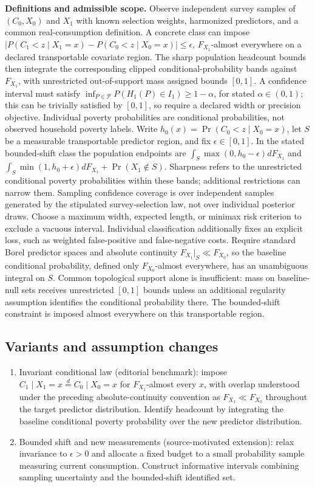 \documentclass[11pt,a4paper]{article}
\begin{document}
\textbf{Definitions and admissible scope.} Observe independent survey samples of \((C_0,X_0)\) and \(X_1\) with known selection weights, harmonized predictors, and a common real-consumption definition. A concrete class can impose \(|P(C_1<z\mid X_1=x)-P(C_0<z\mid X_0=x)|\le\epsilon\), \(F_{X_1}\)-almost everywhere on a declared transportable covariate region. The sharp population headcount bounds then integrate the corresponding clipped conditional-probability bands against \(F_{X_1}\), with unrestricted out-of-support mass assigned bounds \([0,1]\). A confidence interval must satisfy \(\inf_{P\in\mathcal P}P(H_1(P)\in I_1)\ge1-\alpha\), for stated \(\alpha\in(0,1)\); this can be trivially satisfied by \([0,1]\), so require a declared width or precision objective. Individual poverty probabilities are conditional probabilities, not observed household poverty labels. Write \(h_0(x)=\Pr(C_0<z\mid X_0=x)\), let \(S\) be a measurable transportable predictor region, and fix \(\epsilon\in[0,1]\). In the stated bounded-shift class the population endpoints are \(\int_S\max(0,h_0-\epsilon)dF_{X_1}\) and \(\int_S\min(1,h_0+\epsilon)dF_{X_1}+\Pr(X_1\notin S)\). Sharpness refers to the unrestricted conditional poverty probabilities within these bands; additional restrictions can narrow them. Sampling confidence coverage is over independent samples generated by the stipulated survey-selection law, not over individual posterior draws. Choose a maximum width, expected length, or minimax risk criterion to exclude a vacuous interval. Individual classification additionally fixes an explicit loss, such as weighted false-positive and false-negative costs. Require standard Borel predictor spaces and absolute continuity \(F_{X_1}|_S\ll F_{X_0}\), so the baseline conditional probability, defined only \(F_{X_0}\)-almost everywhere, has an unambiguous integral on \(S\). Common topological support alone is insufficient: mass on baseline-null sets receives unrestricted \([0,1]\) bounds unless an additional regularity assumption identifies the conditional probability there. The bounded-shift constraint is imposed almost everywhere on this transportable region.
\subsection*{Variants and assumption changes}
\begin{enumerate}
\item Invariant conditional law (editorial benchmark): impose \(C_1\mid X_1=x\stackrel d=C_0\mid X_0=x\) for \(F_{X_1}\)-almost every \(x\), with overlap understood under the preceding absolute-continuity convention as \(F_{X_1}\ll F_{X_0}\) throughout the target predictor distribution. Identify headcount by integrating the baseline conditional poverty probability over the new predictor distribution.
\item Bounded shift and new measurements (source-motivated extension): relax invariance to \(\epsilon>0\) and allocate a fixed budget to a small probability sample measuring current consumption. Construct informative intervals combining sampling uncertainty and the bounded-shift identified set.
\end{enumerate}
\end{document}
